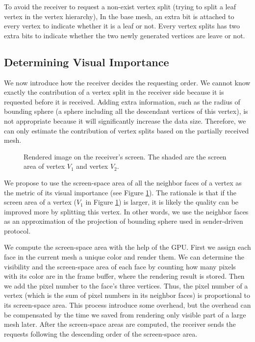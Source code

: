      To avoid the receiver to request a non-exist vertex split (trying to split
     a leaf vertex in the vertex hierarchy),
     In the base mesh, an extra bit is attached to every vertex to indicate whether it is a leaf or not.
     Every vertex splits has two extra bits to indicate whether the two newly generated vertices are 
     leave or not.
     \subsection{Determining Visual Importance}
     \label{ss:dstream:visual}
     We now introduce how the receiver decides the requesting order. 
     We cannot know exactly the contribution of a vertex split in the receiver side
     because it is requested before it is received.
     Adding extra information, such as the radius of bounding sphere (a sphere including all the 
     descendant vertices of this vertex), is not appropriate
     because it will significantly increase the data size. 
     Therefore, we can only estimate the contribution of vertex splits based on the 
     partially received mesh.
     
    \begin{figure}
    \centering
    \caption[Screen area]{Rendered image on the receiver's screen. 
    The shaded are the screen area of vertex $V_1$ and vertex $V_2$.
    \label{dstream:screen_area}}
    \end{figure}
     We propose to use the screen-space area of all the neighbor faces of a vertex as the 
     metric of its visual importance (see Figure \ref{dstream:screen_area}).
     The rationale is that if the screen area of a vertex ($V_1$ in Figure \ref{dstream:screen_area}) 
    is larger, it is likely the quality can be improved more by splitting this vertex. 
    In other words, we use the neighbor faces as an approximation of the projection of bounding sphere used
    in sender-driven protocol.
    
    We compute the screen-space area with the help of the GPU. 
    First we assign each face in the current mesh a unique color and render them. 
    We can determine the visibility
    and the screen-space area of each face by counting how many pixels with its color
    are in the frame buffer, where the rendering result is stored. 
    Then we add the pixel number to the face's three vertices. Thus, the
    pixel number of a vertex (which is the sum of pixel numbers in its neighbor faces)
    is proportional to its screen-space area.
    This process introduce some overhead, but the overhead can be compensated by the time
    we saved from rendering only visible part of a large mesh later. 
    After the screen-space areas are computed, 
    the receiver sends the requests following the descending order of the 
    screen-space area. 
    
